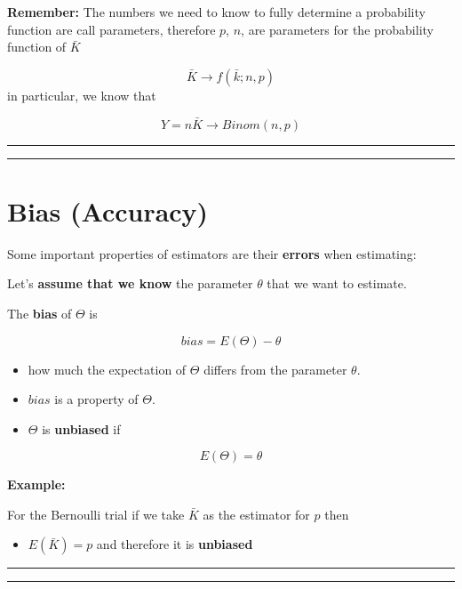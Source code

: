 \documentclass[
]{book}
\providecommand{\tightlist}{%
  \setlength{\itemsep}{0pt}\setlength{\parskip}{0pt}}
\begin{document}
\textbf{Remember:} The numbers we need to know to fully determine a probability function are call parameters, therefore \(p\), \(n\), are parameters for the probability function of \(\bar{K}\)

\[\bar{K} \rightarrow f(\bar{k}; n, p)\]
in particular, we know that

\[Y=n\bar{K} \rightarrow Binom(n, p)\]

\begin{center}\rule{0.5\linewidth}{0.5pt}\end{center}

\begin{center}\rule{0.5\linewidth}{0.5pt}\end{center}

\hypertarget{bias-accuracy}{%
\section{Bias (Accuracy)}\label{bias-accuracy}}

Some important properties of estimators are their \textbf{errors} when estimating:

Let's \textbf{assume that we know} the parameter \(\theta\) that we want to estimate.

The \textbf{bias} of \(\Theta\) is

\[bias=E(\Theta)-\theta\]

\begin{itemize}
\item
  how much the expectation of \(\Theta\) differs from the parameter \(\theta\).
\item
  \(bias\) is a property of \(\Theta\).
\item
  \(\Theta\) is \textbf{unbiased} if
\end{itemize}

\[E(\Theta)=\theta\]

\textbf{Example:}

For the Bernoulli trial if we take \(\bar{K}\) as the estimator for \(p\) then

\begin{itemize}
\tightlist
\item
  \(E(\bar{K})=p\) and therefore it is \textbf{unbiased}
\end{itemize}

\begin{center}\rule{0.5\linewidth}{0.5pt}\end{center}

\begin{center}\rule{0.5\linewidth}{0.5pt}\end{center}
\end{document}
